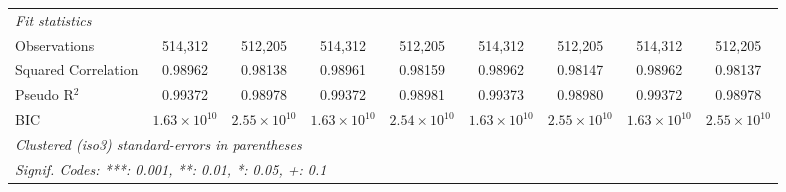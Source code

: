 \begin{tabular}{lcccccccc}
   \midrule
   \emph{Fit statistics}\\
   Observations                                                      & 514,312               & 512,205               & 514,312               & 512,205               & 514,312               & 512,205               & 514,312               & 512,205\\  
   Squared Correlation                                               & 0.98962               & 0.98138               & 0.98961               & 0.98159               & 0.98962               & 0.98147               & 0.98962               & 0.98137\\  
   Pseudo R$^2$                                                      & 0.99372               & 0.98978               & 0.99372               & 0.98981               & 0.99373               & 0.98980               & 0.99372               & 0.98978\\  
   BIC                                                               & $1.63\times 10^{10}$  & $2.55\times 10^{10}$  & $1.63\times 10^{10}$  & $2.54\times 10^{10}$  & $1.63\times 10^{10}$  & $2.55\times 10^{10}$  & $1.63\times 10^{10}$  & $2.55\times 10^{10}$\\   
   \midrule \midrule
   \multicolumn{9}{l}{\emph{Clustered (iso3) standard-errors in parentheses}}\\
   \multicolumn{9}{l}{\emph{Signif. Codes: ***: 0.001, **: 0.01, *: 0.05, +: 0.1}}\\
\end{tabular}
\par\endgroup


